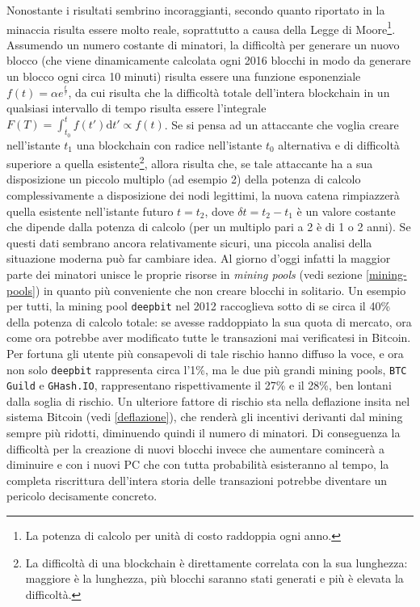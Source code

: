 Nonostante i risultati sembrino incoraggianti, secondo quanto riportato in \cite{bitter-better} la minaccia risulta essere molto reale, soprattutto a causa della Legge di Moore\footnote{La potenza di calcolo per unità di costo raddoppia ogni anno.}.
Assumendo un numero costante di minatori, la difficoltà per generare un nuovo blocco (che viene dinamicamente calcolata ogni 2016 blocchi in modo da generare un blocco ogni circa 10 minuti) risulta essere una funzione esponenziale $f(t) = \alpha e^\frac{t}{\tau}$, da cui risulta che la difficoltà totale dell'intera blockchain in un qualsiasi intervallo di tempo risulta essere l'integrale $F(T) = \int^t_{t_0} f(t')\mathrm{d} t' \propto f(t)$.
Se si pensa ad un attaccante che voglia creare nell'istante $t_1$ una blockchain con radice nell'istante $t_0$ alternativa e di difficoltà superiore a quella esistente\footnote{La difficoltà di una blockchain è direttamente correlata con la sua lunghezza: maggiore è la lunghezza, più blocchi saranno stati generati e più è elevata la difficoltà.}, allora risulta che, se tale attaccante ha a sua disposizione un piccolo multiplo (ad esempio 2) della potenza di calcolo complessivamente a disposizione dei nodi legittimi, la nuova catena rimpiazzerà quella esistente nell'istante futuro $t=t_2$, dove $\delta t = t_2 - t_1$ è un valore costante che dipende dalla potenza di calcolo (per un multiplo pari a 2 è di 1 o 2 anni).
Se questi dati sembrano ancora relativamente sicuri, una piccola analisi della situazione moderna può far cambiare idea. Al giorno d'oggi infatti la maggior parte dei minatori unisce le proprie risorse in \emph{mining pools} (vedi sezione \ref{mining-pools}) in quanto più conveniente che non creare blocchi in solitario. Un esempio per tutti, la mining pool \verb|deepbit| nel 2012 raccoglieva sotto di se circa il 40\% della potenza di calcolo totale: se avesse raddoppiato la sua quota di mercato, ora come ora potrebbe aver modificato tutte le transazioni mai verificatesi in Bitcoin. Per fortuna gli utente più consapevoli di tale rischio hanno diffuso la voce, e ora non solo \verb|deepbit| rappresenta circa l'1\%, ma le due più grandi mining pools, \verb|BTC Guild| e \verb|GHash.IO|, rappresentano rispettivamente il 27\% e il 28\%, ben lontani dalla soglia di rischio.
Un ulteriore fattore di rischio sta nella deflazione insita nel sistema Bitcoin (vedi \ref{deflazione}), che renderà gli incentivi derivanti dal mining sempre più ridotti, diminuendo quindi il numero di minatori. Di conseguenza la difficoltà per la creazione di nuovi blocchi invece che aumentare comincerà a diminuire e con i nuovi PC che con tutta probabilità esisteranno al tempo, la completa riscrittura dell'intera storia delle transazioni potrebbe diventare un pericolo decisamente concreto.

